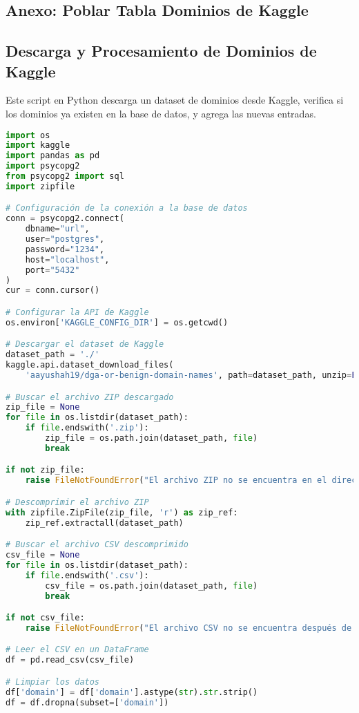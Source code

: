 \subsection{Anexo: Poblar Tabla Dominios de Kaggle}

\subsection*{Descarga y Procesamiento de Dominios de Kaggle}

Este script en Python descarga un dataset de dominios desde Kaggle, verifica si los dominios ya existen en la base de datos, y agrega las nuevas entradas.

\begin{lstlisting}[language=Python, caption=Script para procesar dominios de Kaggle]
import os
import kaggle
import pandas as pd
import psycopg2
from psycopg2 import sql
import zipfile

# Configuración de la conexión a la base de datos
conn = psycopg2.connect(
    dbname="url",
    user="postgres",
    password="1234",
    host="localhost",
    port="5432"
)
cur = conn.cursor()

# Configurar la API de Kaggle
os.environ['KAGGLE_CONFIG_DIR'] = os.getcwd()

# Descargar el dataset de Kaggle
dataset_path = './'
kaggle.api.dataset_download_files(
    'aayushah19/dga-or-benign-domain-names', path=dataset_path, unzip=False)

# Buscar el archivo ZIP descargado
zip_file = None
for file in os.listdir(dataset_path):
    if file.endswith('.zip'):
        zip_file = os.path.join(dataset_path, file)
        break

if not zip_file:
    raise FileNotFoundError("El archivo ZIP no se encuentra en el directorio especificado.")

# Descomprimir el archivo ZIP
with zipfile.ZipFile(zip_file, 'r') as zip_ref:
    zip_ref.extractall(dataset_path)

# Buscar el archivo CSV descomprimido
csv_file = None
for file in os.listdir(dataset_path):
    if file.endswith('.csv'):
        csv_file = os.path.join(dataset_path, file)
        break

if not csv_file:
    raise FileNotFoundError("El archivo CSV no se encuentra después de descomprimir el ZIP.")

# Leer el CSV en un DataFrame
df = pd.read_csv(csv_file)

# Limpiar los datos
df['domain'] = df['domain'].astype(str).str.strip()
df = df.dropna(subset=['domain'])


\end{lstlisting}
